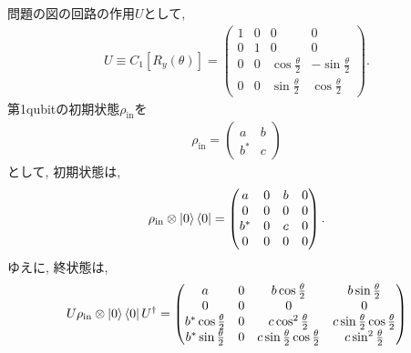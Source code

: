 \begin{ex}
    \label{ex8.26}
    問題の図の回路の作用$U$として,
    \begin{align*}
        U \equiv C_1\left[ R_y(\theta)\right]
        =
        \begin{pmatrix}
            1 & 0 & 0                     & 0                       \\
            0 & 1 & 0                     & 0                       \\
            0 & 0 & \cos \frac{\theta}{2} & - \sin \frac{\theta}{2} \\
            0 & 0 & \sin \frac{\theta}{2} & \cos \frac{\theta}{2}
        \end{pmatrix}.
    \end{align*}
    第1qubitの初期状態$\rho_\mathrm{in}$を
    \begin{align*}
        \rho_\mathrm{in}
        =
        \begin{pmatrix}
            a   & b \\
            b^* & c
        \end{pmatrix}
    \end{align*}
    として, 初期状態は,
    \begin{align*}
        \rho_\mathrm{in} \otimes \ket{0}\bra{0}
        =
        \begin{pmatrix}
            a   & 0 & b & 0 \\
            0   & 0 & 0 & 0 \\
            b^* & 0 & c & 0 \\
            0   & 0 & 0 & 0
        \end{pmatrix}.
    \end{align*}
    ゆえに, 終状態は,
    \begin{align*}
        U  \rho_\mathrm{in} \otimes \ket{0}\bra{0} U^\dagger
        =
        \begin{pmatrix}
            a                         & 0 & b \cos\frac{\theta}{2}                      & b \sin \frac{\theta}{2}                     \\
            0                         & 0 & 0                                           & 0                                           \\
            b^* \cos \frac{\theta}{2} & 0 & c \cos^2 \frac{\theta}{2}                   & c \sin\frac{\theta}{2}\cos \frac{\theta}{2} \\
            b^* \sin \frac{\theta}{2} & 0 & c \sin\frac{\theta}{2}\cos \frac{\theta}{2} & c \sin^2 \frac{\theta}{2}

\end{pmatrix}
\end{align*}
\end{ex}
